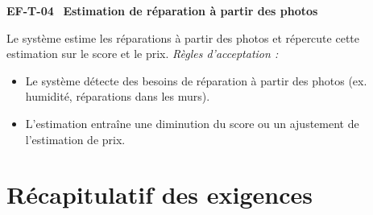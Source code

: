 \documentclass[11pt,a4paper]{article}
\newcommand{\exigence}[2]{%
  \par\vspace{6pt}%
  \noindent\colorbox{light}{%
    \parbox{\dimexpr\textwidth-2\fboxsep}{%
      \textbf{\color{primary}#1} \textemdash\ \textbf{#2}%
    }%
  }\par\vspace{2pt}%
}
\newenvironment{acceptation}
  {\vspace{2pt}\noindent\textit{Règles d'acceptation :}
   \begin{itemize}[leftmargin=1.4em,itemsep=1pt,topsep=2pt]}
  {\end{itemize}\vspace{4pt}}
\begin{document}
\exigence{EF-T-04}{Estimation de réparation à partir des photos}
Le système estime les réparations à partir des photos et répercute cette
estimation sur le score et le prix.
\begin{acceptation}
  \item Le système détecte des besoins de réparation à partir des photos (ex. humidité, réparations dans les murs).
  \item L'estimation entraîne une diminution du score ou un ajustement de l'estimation de prix.
\end{acceptation}

\clearpage

\section{Récapitulatif des exigences}
\end{document}

